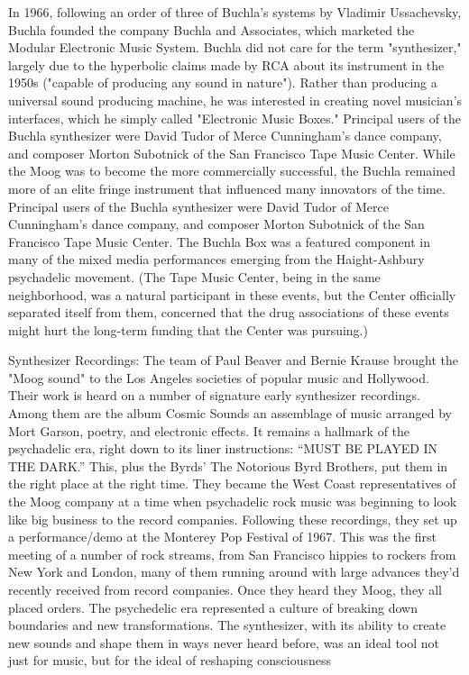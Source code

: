 In 1966, following an order of three of Buchla's systems by Vladimir Ussachevsky, Buchla founded the company Buchla and Associates, which marketed the Modular Electronic Music System. Buchla did not care for the term "synthesizer," largely due to the hyperbolic claims made by RCA about its instrument in the 1950s ("capable of producing any sound in nature"). Rather than producing a universal sound producing machine, he was interested in creating novel musician's interfaces, which he simply called "Electronic Music Boxes." Principal users of the Buchla synthesizer were David Tudor of Merce Cunningham's dance company, and composer Morton Subotnick of the San Francisco Tape Music Center. While the Moog was to become the more commercially successful, the Buchla remained more of an elite fringe instrument that influenced many innovators of the time. Principal users of the Buchla synthesizer were David Tudor of Merce Cunningham's dance company, and composer Morton Subotnick of the San Francisco Tape Music Center. The Buchla Box was a featured component in many of the mixed media performances emerging from the Haight-Ashbury psychadelic movement. (The Tape Music Center, being in the same neighborhood, was a natural participant in these events, but the Center officially separated itself from them, concerned that the drug associations of these events might hurt the long-term funding that the Center was pursuing.)

Synthesizer Recordings: The team of Paul Beaver and Bernie Krause brought the "Moog sound" to the Los Angeles societies of popular music and Hollywood. Their work is heard on a number of signature early synthesizer recordings. Among them are the album Cosmic Sounds an assemblage of music arranged by Mort Garson, poetry, and electronic effects. It remains a hallmark of the psychadelic era, right down to its liner instructions: ``MUST BE PLAYED IN THE DARK.''  This, plus the Byrds' The Notorious Byrd Brothers, put them in the right place at the right time. They became the West Coast representatives of the Moog company at a time when psychadelic rock music was beginning to look like big business to the record companies. Following these recordings, they set up a performance/demo at the Monterey Pop Festival of 1967. This was the first meeting of a number of rock streams, from San Francisco hippies to rockers from New York and London, many of them running around with large advances they'd recently received from record companies. Once they heard they Moog, they all placed orders. The psychedelic era represented a culture of breaking down boundaries and new transformations. The synthesizer, with its ability to create new sounds and shape them in ways never heard before, was an ideal tool not just for music, but for the ideal of reshaping consciousness

